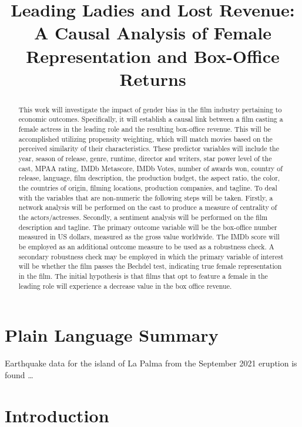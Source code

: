 \documentclass[
]{agujournal2019}
\begin{document}
\title{Leading Ladies and Lost Revenue: A Causal Analysis of Female
Representation and Box-Office Returns}



\begin{abstract}
This work will investigate the impact of gender bias in the film
industry pertaining to economic outcomes. Specifically, it will
establish a causal link between a film casting a female actress in the
leading role and the resulting box-office revenue. This will be
accomplished utilizing propensity weighting, which will match movies
based on the perceived similarity of their characteristics. These
predictor variables will include the year, season of release, genre,
runtime, director and writers, star power level of the cast, MPAA
rating, IMDb Metascore, IMDb Votes, number of awards won, country of
release, language, film description, the production budget, the aspect
ratio, the color, the countries of origin, filming locations, production
companies, and tagline. To deal with the variables that are non-numeric
the following steps will be taken. Firstly, a network analysis will be
performed on the cast to produce a measure of centrality of the
actors/actresses. Secondly, a sentiment analysis will be performed on
the film description and tagline. The primary outcome variable will be
the box-office number measured in US dollars, measured as the gross
value worldwide. The IMDb score will be employed as an additional
outcome measure to be used as a robustness check. A secondary robustness
check may be employed in which the primary variable of interest will be
whether the film passes the Bechdel test, indicating true female
representation in the film. The initial hypothesis is that films that
opt to feature a female in the leading role will experience a decrease
value in the box office revenue.
\end{abstract}

\section*{Plain Language Summary}
Earthquake data for the island of La Palma from the September 2021
eruption is found \ldots{}




\section{Introduction}\label{introduction}
\end{document}
